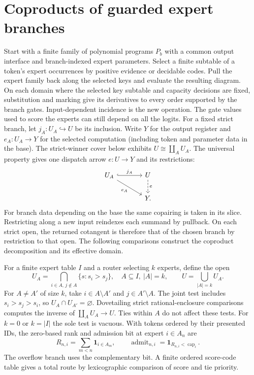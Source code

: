 \documentclass[11pt,a4paper]{article}
\theoremstyle{definition}
\theoremstyle{remark}\newaliascnt{remark}{theorem}
\numberwithin{equation}{section}
\begin{document}
\section{Coproducts of guarded expert branches}\label{sec:experts}

Start with a finite family of polynomial programs $P_b$ with a common output interface and branch-indexed expert parameters. Select a finite subtable of a token's expert occurrences by positive evidence or decidable codes. Pull the expert family back along the selected keys and evaluate the resulting diagram. On each domain where the selected key subtable and capacity decisions are fixed, substitution and marking give its derivatives to every order supported by the branch gates. Input-dependent incidence is the new operation. The gate values used to score the experts can still depend on all the logits.
For a fixed strict branch, let \(j_A:U_A\hookrightarrow U\) be its inclusion. Write \(Y\) for the output register and \(e_A:U_A\to Y\) for the selected computation (including token and parameter data in the base). The strict-winner cover below exhibits \(U\cong\coprod_A U_A\). The universal property gives one dispatch arrow \(e:U\to Y\) and its restrictions:
\[
\begin{tikzcd}[column sep=large]
 U_A\arrow[r,hook,"j_A"]\arrow[dr,"e_A"']&
 U\arrow[d,dashed,"e"]\\
 &Y .
\end{tikzcd}
\]
For branch data depending on the base the same copairing is taken in its slice. Restricting along a new input reindexes each summand by pullback. On each strict open, the returned cotangent is therefore that of the chosen branch by restriction to that open. The following comparisons construct the coproduct decomposition and its effective domain.

For a finite expert table \(I\) and a router selecting \(k\) experts, define the open
\[
 U_A=\bigcap_{i\in A,\,j\notin A}\{s:s_i>s_j\},
 \quad A\subseteq I,\ |A|=k,\qquad U=\bigcup_{|A|=k}U_A .
\]
For \(A\ne A'\) of size \(k\), take \(i\in A\setminus A'\) and \(j\in A'\setminus A\). The joint test includes \(s_i>s_j>s_i\), so \(U_A\cap U_{A'}=\varnothing\). Dovetailing strict rational-enclosure comparisons computes the inverse of \(\coprod_A U_A\to U\). Ties within \(A\) do not affect these tests. For \(k=0\) or \(k=|I|\) the sole test is vacuous. With tokens ordered by their presented IDs, the zero-based rank and admission bit at expert \(i\in A_n\) are
\[
 R_{n,i}=\sum_{m<n}\mathbf1_{i\in A_m},\qquad
 \operatorname{admit}_{n,i}=\mathbf1_{R_{n,i}<\operatorname{cap}_i}.
\]
The overflow branch uses the complementary bit. A finite ordered score-code table gives a total route by lexicographic comparison of score and tie priority.
\end{document}
